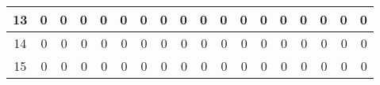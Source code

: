 \begin{table}[ht]
\begin{adjustbox}{width = \textwidth, center}
\begin{tabular}{|c|r|r|r|r|r|r|r|r|r|r|r|r|r|r|r|r|r|}
            \rowcolor[HTML]{FFFFFF} 
            \cellcolor[HTML]{CFE2F3}13                           & 0                                              & 0                                              & 0                                              & 0                                              & 0                                              & 0                                              & 0                                              & 0                                               & 0                                               & 0                                               & 0                                               & 0                                               & 0                                               & 0                                               & 0                                               & \cellcolor[HTML]{D9D2E9}0                                                             & \cellcolor[HTML]{D9D2E9}0                                                                 \\ \hline
            \rowcolor[HTML]{FFFFFF} 
            \cellcolor[HTML]{CFE2F3}14                           & 0                                              & 0                                              & 0                                              & 0                                              & 0                                              & 0                                              & 0                                              & 0                                               & 0                                               & 0                                               & 0                                               & 0                                               & 0                                               & 0                                               & 0                                               & \cellcolor[HTML]{D9D2E9}0                                                             & \cellcolor[HTML]{D9D2E9}0                                                                 \\ \hline
            \rowcolor[HTML]{FFFFFF} 
            \cellcolor[HTML]{CFE2F3}15                           & 0                                              & 0                                              & 0                                              & 0                                              & 0                                              & 0                                              & 0                                              & 0                                               & 0                                               & 0                                               & 0                                               & 0                                               & 0                                               & 0                                               & 0                                               & \cellcolor[HTML]{D9D2E9}0                                                             & \cellcolor[HTML]{D9D2E9}0                                                                 \\ \hline

\end{tabular}
\end{adjustbox}
\end{table}
